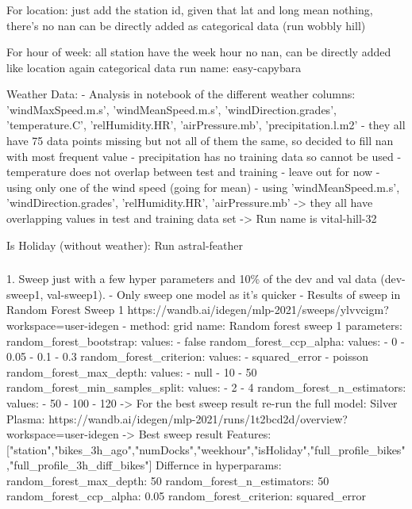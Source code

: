 \documentclass[a4paper]{article}
\begin{document}
    \subsubsection*{}
    For location: just add the station id, given that lat and long mean nothing, there's no nan can be directly added
    as categorical data
    (run wobbly hill)

    For hour of week: all station have the week hour no nan, can be directly added like location again categorical data
    run name: easy-capybara

    Weather Data:
    - Analysis in notebook of the different weather columns: 'windMaxSpeed.m.s', 'windMeanSpeed.m.s', 'windDirection.grades',
    'temperature.C', 'relHumidity.HR', 'airPressure.mb', 'precipitation.l.m2'
    - they all have 75 data points missing but not all of them the same, so decided to fill nan with most frequent value
    - precipitation has no training data so cannot be used
    - temperature does not overlap between test and training - leave out for now
    - using only one of the wind speed (going for mean)
    - using 'windMeanSpeed.m.s', 'windDirection.grades', 'relHumidity.HR', 'airPressure.mb' -> they all have overlapping values
    in test and training data set
    -> Run name is vital-hill-32

    Is Holiday (without weather): Run astral-feather


    \subsubsection*{}

    1. Sweep just with a few hyper parameters and 10\% of the dev and val data (dev-sweep1, val-sweep1).
    - Only sweep one model as it's quicker
    - Results of sweep in Random Forest Sweep 1 https://wandb.ai/idegen/mlp-2021/sweeps/ylvvcigm?workspace=user-idegen
    - method: grid
    name: Random forest sweep 1
    parameters:
    random\_forest\_bootstrap:
    values:
    - false
    random\_forest\_ccp\_alpha:
    values:
    - 0
    - 0.05
    - 0.1
    - 0.3
    random\_forest\_criterion:
    values:
    - squared\_error
    - poisson
    random\_forest\_max\_depth:
    values:
    - null
    - 10
    - 50
    random\_forest\_min\_samples\_split:
    values:
    - 2
    - 4
    random\_forest\_n\_estimators:
    values:
    - 50
    - 100
    - 120
    -> For the best sweep result re-run the full model:
    Silver Plasma: https://wandb.ai/idegen/mlp-2021/runs/1t2bcd2d/overview?workspace=user-idegen
    -> Best sweep result
    Features:
    ["station","bikes\_3h\_ago","numDocks","weekhour","isHoliday","full\_profile\_bikes","full\_profile\_3h\_diff\_bikes"]
    Differnce in hyperparams:
    random\_forest\_max\_depth: 50
    random\_forest\_n\_estimators: 50
    random\_forest\_ccp\_alpha: 0.05
    random\_forest\_criterion: squared\_error
\end{document}
